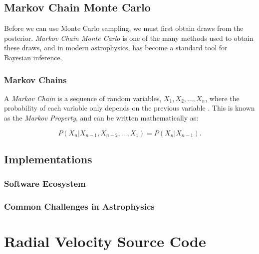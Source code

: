 \documentclass[preprint,longauthor]{aastex631}
\numberwithin{equation}{section}
\begin{document}
\subsection{Markov Chain Monte Carlo}
Before we can use Monte Carlo sampling, we must first obtain draws from the posterior. \textit{Markov Chain Monte Carlo} is one of the many methods used to obtain these draws, and in modern astrophysics, has become a standard tool for Bayesian inference.

\subsubsection{Markov Chains}
A \textit{Markov Chain} is a sequence of random variables, $X_1, X_2, \hdots, X_n$, where the probability of each variable only depends on the previous variable \citep{trottaBayesSkyBayesian2008}. This is known as the \textit{Markov Property}, and can be written mathematically as:

\begin{equation}
  P(X_n|X_{n-1},X_{n-2},\hdots,X_1) = P(X_n|X_{n-1}).
\end{equation}

\subsection{Implementations}
\subsubsection{Software Ecosystem}
\subsubsection{Common Challenges in Astrophysics}

\appendix
\section[Appendix A]{Radial Velocity Source Code}
\label{appx:A}




\end{document}
